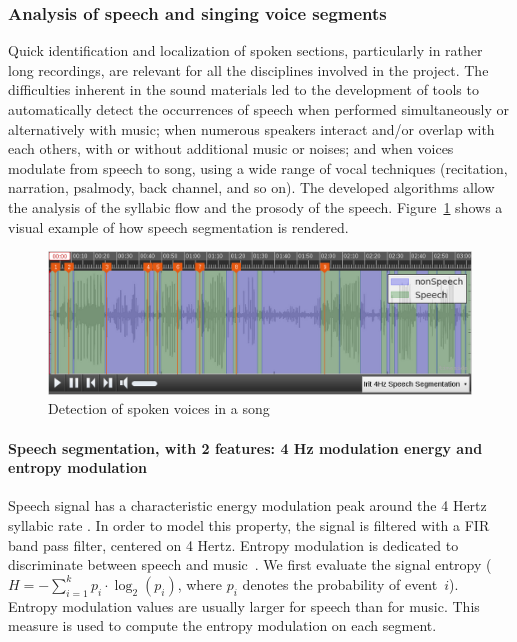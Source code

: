 \documentclass{sig-alternate}
\newcommand{\squeezeup}{\vspace{-2.5mm}}
\begin{document}
\subsubsection{Analysis of speech and singing voice segments}
Quick identification and localization of spoken sections, particularly in rather long recordings, are relevant for all the disciplines involved in the project. The difficulties inherent in the sound materials led to the development of tools to automatically detect the occurrences of speech when performed simultaneously or alternatively with music; when numerous speakers interact and/or overlap with each others, with or without additional music or noises; and when voices modulate from speech to song, using a wide range of vocal techniques (recitation, narration, psalmody, back channel, and so on). The developed algorithms allow the analysis of the syllabic flow and the prosody of the speech. 
Figure~\ref{fig:speech_detection} shows a visual example of how speech segmentation is rendered.

\begin{figure}[htb]
  \centering
 \includegraphics[width=\linewidth]{img/IRIT_Speech4Hz.png} 
  \caption{Detection of spoken voices in a song}
  \label{fig:speech_detection}
\end{figure}

\squeezeup\paragraph{Speech segmentation, with 2 features: 4 Hz modulation energy and entropy modulation} 
Speech signal has a characteristic energy modulation peak around the 4 Hertz syllabic rate \cite{Houtgast1985}. In order to model this property, the signal is filtered with a FIR band pass filter, centered on 4 Hertz.
Entropy modulation is dedicated to discriminate between speech and music~\cite{Pinquier2003}. We first evaluate the signal entropy ($H=-\sum_{i=1}^{k}p_i\cdot \log_2(p_i)$, where $p_i$ denotes the probability of event~$i$). Entropy modulation values are usually larger for speech than for music. This measure is used to compute the entropy modulation on each segment. 
\end{document}
